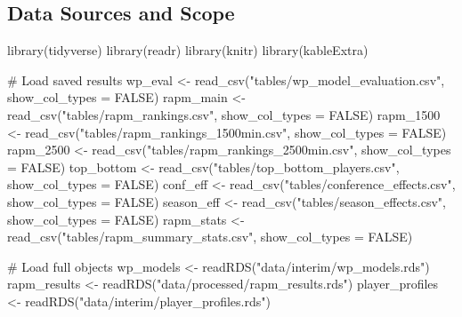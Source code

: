\documentclass[
  letterpaper,
  DIV=11,
  numbers=noendperiod]{scrartcl}
\newenvironment{Shaded}{\begin{snugshade}}{\end{snugshade}}
\newcommand{\AttributeTok}[1]{\textcolor[rgb]{0.40,0.45,0.13}{#1}}
\newcommand{\CommentTok}[1]{\textcolor[rgb]{0.37,0.37,0.37}{#1}}
\newcommand{\ConstantTok}[1]{\textcolor[rgb]{0.56,0.35,0.01}{#1}}
\newcommand{\FunctionTok}[1]{\textcolor[rgb]{0.28,0.35,0.67}{#1}}
\newcommand{\NormalTok}[1]{\textcolor[rgb]{0.00,0.23,0.31}{#1}}
\newcommand{\OtherTok}[1]{\textcolor[rgb]{0.00,0.23,0.31}{#1}}
\newcommand{\StringTok}[1]{\textcolor[rgb]{0.13,0.47,0.30}{#1}}
\begin{document}
\subsection{Data Sources and Scope}\label{data-sources-and-scope}

\begin{Shaded}
\begin{Highlighting}[]
\FunctionTok{library}\NormalTok{(tidyverse)}
\FunctionTok{library}\NormalTok{(readr)}
\FunctionTok{library}\NormalTok{(knitr)}
\FunctionTok{library}\NormalTok{(kableExtra)}

\CommentTok{\# Load saved results}
\NormalTok{wp\_eval }\OtherTok{\textless{}{-}} \FunctionTok{read\_csv}\NormalTok{(}\StringTok{"tables/wp\_model\_evaluation.csv"}\NormalTok{, }\AttributeTok{show\_col\_types =} \ConstantTok{FALSE}\NormalTok{)}
\NormalTok{rapm\_main }\OtherTok{\textless{}{-}} \FunctionTok{read\_csv}\NormalTok{(}\StringTok{"tables/rapm\_rankings.csv"}\NormalTok{, }\AttributeTok{show\_col\_types =} \ConstantTok{FALSE}\NormalTok{)}
\NormalTok{rapm\_1500 }\OtherTok{\textless{}{-}} \FunctionTok{read\_csv}\NormalTok{(}\StringTok{"tables/rapm\_rankings\_1500min.csv"}\NormalTok{, }\AttributeTok{show\_col\_types =} \ConstantTok{FALSE}\NormalTok{)}
\NormalTok{rapm\_2500 }\OtherTok{\textless{}{-}} \FunctionTok{read\_csv}\NormalTok{(}\StringTok{"tables/rapm\_rankings\_2500min.csv"}\NormalTok{, }\AttributeTok{show\_col\_types =} \ConstantTok{FALSE}\NormalTok{)}
\NormalTok{top\_bottom }\OtherTok{\textless{}{-}} \FunctionTok{read\_csv}\NormalTok{(}\StringTok{"tables/top\_bottom\_players.csv"}\NormalTok{, }\AttributeTok{show\_col\_types =} \ConstantTok{FALSE}\NormalTok{)}
\NormalTok{conf\_eff }\OtherTok{\textless{}{-}} \FunctionTok{read\_csv}\NormalTok{(}\StringTok{"tables/conference\_effects.csv"}\NormalTok{, }\AttributeTok{show\_col\_types =} \ConstantTok{FALSE}\NormalTok{)}
\NormalTok{season\_eff }\OtherTok{\textless{}{-}} \FunctionTok{read\_csv}\NormalTok{(}\StringTok{"tables/season\_effects.csv"}\NormalTok{, }\AttributeTok{show\_col\_types =} \ConstantTok{FALSE}\NormalTok{)}
\NormalTok{rapm\_stats }\OtherTok{\textless{}{-}} \FunctionTok{read\_csv}\NormalTok{(}\StringTok{"tables/rapm\_summary\_stats.csv"}\NormalTok{, }\AttributeTok{show\_col\_types =} \ConstantTok{FALSE}\NormalTok{)}

\CommentTok{\# Load full objects}
\NormalTok{wp\_models }\OtherTok{\textless{}{-}} \FunctionTok{readRDS}\NormalTok{(}\StringTok{"data/interim/wp\_models.rds"}\NormalTok{)}
\NormalTok{rapm\_results }\OtherTok{\textless{}{-}} \FunctionTok{readRDS}\NormalTok{(}\StringTok{"data/processed/rapm\_results.rds"}\NormalTok{)}
\NormalTok{player\_profiles }\OtherTok{\textless{}{-}} \FunctionTok{readRDS}\NormalTok{(}\StringTok{"data/interim/player\_profiles.rds"}\NormalTok{)}
\end{Highlighting}
\end{Shaded}
\end{document}
